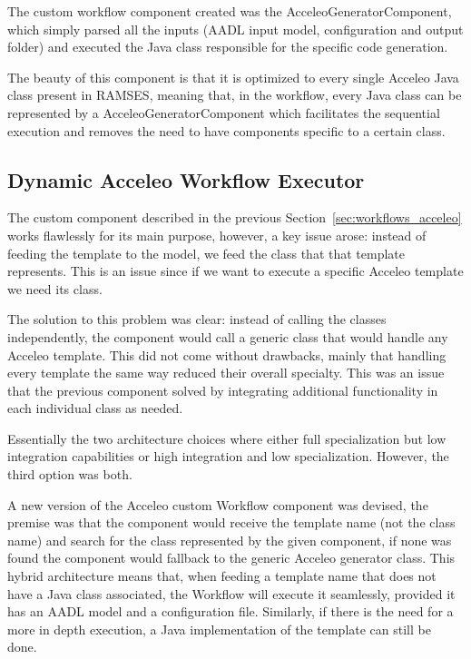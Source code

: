 The custom workflow component created was the AcceleoGeneratorComponent, which simply parsed all the inputs (AADL input model, configuration and output folder) and executed the Java class responsible for the specific code generation.

The beauty of this component is that it is optimized to every single Acceleo Java class present in \gls{RAMSES}, meaning that, in the workflow, every Java class can be represented by a AcceleoGeneratorComponent which facilitates the sequential execution and removes the need to have components specific to a certain class.


\subsection{Dynamic Acceleo Workflow Executor}
\label{sec:workflows_dynamic_executor}

The custom component described in the previous Section~\ref{sec:workflows_acceleo} works flawlessly for its main purpose, however, a key issue arose: instead of feeding the template to the model, we feed the class that that template represents. This is an issue since if we want to execute a specific Acceleo template we need its class.

The solution to this problem was clear: instead of calling the classes independently, the component would call a generic class that would handle any Acceleo template. This did not come without drawbacks, mainly that handling every template the same way reduced their overall specialty. This was an issue that the previous component solved by integrating additional functionality in each individual class as needed.

Essentially the two architecture choices where either full specialization but low integration capabilities or high integration and low specialization. However, the third option was both.

A new version of the Acceleo custom Workflow component was devised, the premise was that the component would receive the template name (not the class name) and search for the class represented by the given component, if none was found the component would fallback to the generic Acceleo generator class. This hybrid architecture means that, when feeding a template name that does not have a Java class associated, the Workflow will execute it seamlessly, provided it has an \gls{AADL} model and a configuration file. Similarly, if there is the need for a more in depth execution, a Java implementation of the template can still be done.


